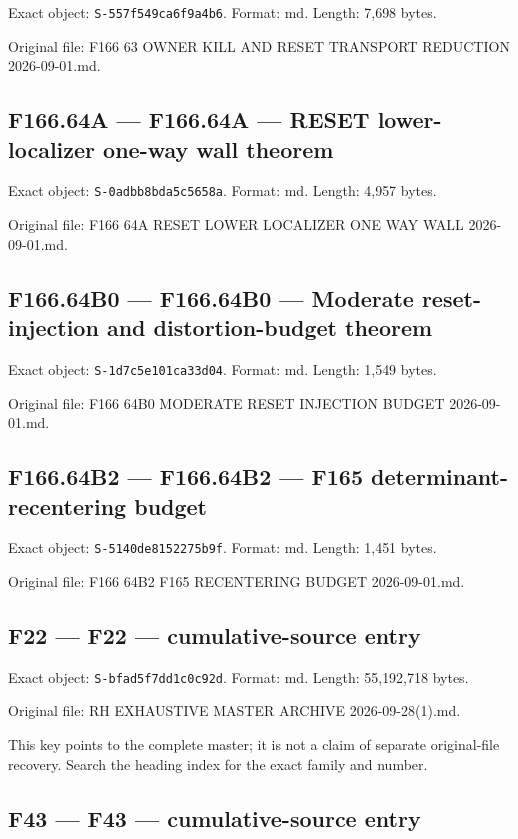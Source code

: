 \documentclass[
  10pt,
  a4paper,
  10pt,
  oneside,
  openany]{book}
\begin{document}
Exact object: \texttt{S-557f549ca6f9a4b6}. Format: md. Length: 7,698
bytes.

Original file: F166 63 OWNER KILL AND RESET TRANSPORT REDUCTION
2026-09-01.md.

\subsection{F166.64A --- F166.64A --- RESET lower-localizer one-way wall
theorem}\label{source-f166-64a}

Exact object: \texttt{S-0adbb8bda5c5658a}. Format: md. Length: 4,957
bytes.

Original file: F166 64A RESET LOWER LOCALIZER ONE WAY WALL
2026-09-01.md.

\subsection{F166.64B0 --- F166.64B0 --- Moderate reset-injection and
distortion-budget theorem}\label{source-f166-64b0}

Exact object: \texttt{S-1d7c5e101ca33d04}. Format: md. Length: 1,549
bytes.

Original file: F166 64B0 MODERATE RESET INJECTION BUDGET 2026-09-01.md.

\subsection{F166.64B2 --- F166.64B2 --- F165 determinant-recentering
budget}\label{source-f166-64b2}

Exact object: \texttt{S-5140de8152275b9f}. Format: md. Length: 1,451
bytes.

Original file: F166 64B2 F165 RECENTERING BUDGET 2026-09-01.md.

\subsection{F22 --- F22 --- cumulative-source entry}\label{source-f22}

Exact object: \texttt{S-bfad5f7dd1c0c92d}. Format: md. Length:
55,192,718 bytes.

Original file: RH EXHAUSTIVE MASTER ARCHIVE 2026-09-28(1).md.

This key points to the complete master; it is not a claim of separate
original-file recovery. Search the heading index for the exact family
and number.

\subsection{F43 --- F43 --- cumulative-source entry}\label{source-f43}
\end{document}

